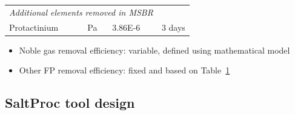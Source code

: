 \begin{frame}
\begin{textblock*}{12.5cm}
\begin{table}[htbp!]
\begin{tabular}{p{} p{} p{} 
				p{}}
			\hline
			\multicolumn{3}{c}{\textit{Additional elements removed in 
			\gls{MSBR}} 
				\cite{robertson_conceptual_1971}} \\
			Protactinium & Pa  	& 3.86E-6 & 3 days    \\
			\hline
		\end{tabular}
		\label{tab:reprocessing_list}
	\end{table}
	\begin{itemize}
		\item Noble gas removal efficiency: variable, defined using 
		mathematical model
		\item Other FP removal efficiency: fixed and based on 
		Table~\ref{tab:reprocessing_list}
	\end{itemize}
\end{textblock*}
\end{frame}


\subsection{SaltProc tool design}


